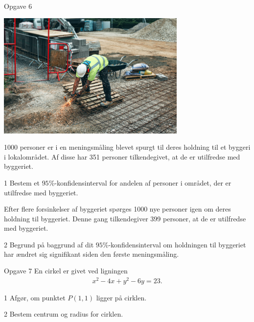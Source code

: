 
\begin{opgavetekst}{Opgave 6}
	\begin{center}
		\includegraphics[width = 0.7\textwidth]{Billeder/bygge.jpg}
	\end{center}
	1000 personer er i en meningsmåling blevet spurgt til deres holdning til et byggeri i lokalområdet. Af disse har
	351 personer tilkendegivet, at de er utilfredse med byggeriet. 
\end{opgavetekst}
\begin{delopgave}{}{1}
	Bestem et $95\%$-konfidensinterval for andelen af personer i området, der er utilfredse med byggeriet. 
\end{delopgave}
\begin{meretekst}
	Efter flere forsinkelser af byggeriet spørges 1000 nye personer igen om deres holdning til byggeriet. Denne gang 
	tilkendegiver 399 personer, at de er utilfredse med byggeriet. 
\end{meretekst}
\begin{delopgave}{}{2}
	Begrund på baggrund af dit $95\%$-konfidensinterval om holdningen til byggeriet har ændret sig signifikant siden 
	den første meningsmåling. 
\end{delopgave}


\begin{opgavetekst}{Opgave 7}
	En cirkel er givet ved ligningen 
	\begin{align*}
		x^2-4x+y^2-6y=23.
	\end{align*}
\end{opgavetekst}
\begin{delopgave}{}{1}
	Afgør, om punktet $P(1,1)$ ligger på cirklen. 
\end{delopgave}
\begin{delopgave}{}{2}
	Bestem centrum og radius for cirklen. 
\end{delopgave}


